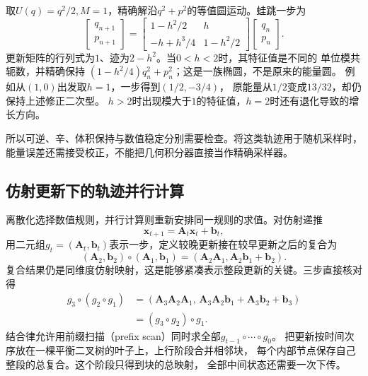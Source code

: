 \begin{example}[谐振子的精确与数值轨道]
  \label{ex:dynamical-harmonic-oscillator}
  取$U(q)=q^2/2,M=1$，精确解沿$q^2+p^2$的等值圆运动。蛙跳一步为
  \[
    \begin{bmatrix}q_{n+1}\\p_{n+1}\end{bmatrix}
    =
    \begin{bmatrix}1-h^2/2&h\\-h+h^3/4&1-h^2/2\end{bmatrix}
    \begin{bmatrix}q_n\\p_n\end{bmatrix}.
  \]
  更新矩阵的行列式为$1$、迹为$2-h^2$。当$0<h<2$时，其特征值是不同的
  单位模共轭数，并精确保持
  $(1-h^2/4)q_n^2+p_n^2$；这是一族椭圆，不是原来的能量圆。
  例如从$(1,0)$出发取$h=1$，一步得到$(1/2,-3/4)$，
  原能量从$1/2$变成$13/32$，却仍保持上述修正二次型。
  $h>2$时出现模大于$1$的特征值，$h=2$时还有退化导致的增长方向。
\end{example}
所以可逆、辛、体积保持与数值稳定分别需要检查。将这类轨迹用于随机采样时，
能量误差还需接受校正，不能把几何积分器直接当作精确采样器。

\subsection{仿射更新下的轨迹并行计算}

离散化选择数值规则，并行计算则重新安排同一规则的求值。对仿射递推
\begin{equation}
  \bm x_{t+1}=\bm A_t\bm x_t+\bm b_t,
  \label{eq:dynamical-affine-recurrence}
\end{equation}
用二元组$g_t=(\bm A_t,\bm b_t)$表示一步，定义较晚更新接在较早更新之后的复合为
\begin{equation}
  (\bm A_2,\bm b_2)\circ(\bm A_1,\bm b_1)
  =(\bm A_2\bm A_1,\bm A_2\bm b_1+\bm b_2).
  \label{eq:dynamical-affine-composition}
\end{equation}
复合结果仍是同维度仿射映射，这是能够紧凑表示整段更新的关键。三步直接核对得
\[
  \begin{aligned}
    g_3\circ(g_2\circ g_1)
    &=(\bm A_3\bm A_2\bm A_1,\,
       \bm A_3\bm A_2\bm b_1+\bm A_3\bm b_2+\bm b_3)\\
    &=(g_3\circ g_2)\circ g_1.
  \end{aligned}
\]
结合律允许用前缀扫描（prefix scan）同时求全部$g_{t-1}\circ\cdots\circ g_0$。
把更新按时间次序放在一棵平衡二叉树的叶子上，上行阶段合并相邻块，
每个内部节点保存自己整段的总复合。这个阶段只得到块的总映射，
全部中间状态还需要一次下传。

